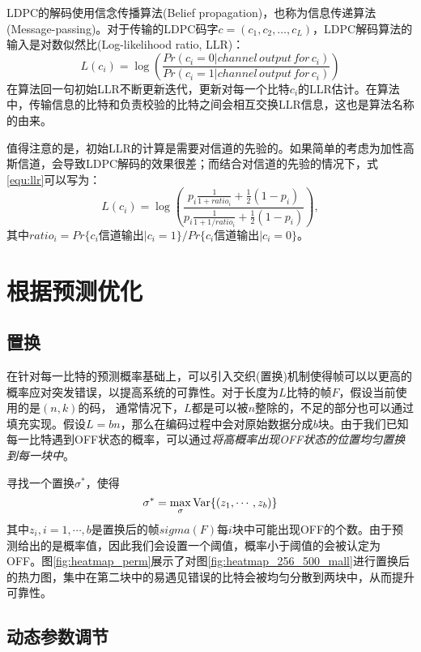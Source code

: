 LDPC的解码使用信念传播算法(Belief propagation)，也称为信息传递算法(Message-passing)。对于传输的LDPC码字$c = (c_1, c_2, …, c_{L})$，LDPC解码算法的输入是对数似然比(Log-likelihood ratio, LLR)：
\begin{equation}
\label{equ:llr}
L(c_i)=\log\left(\frac{Pr(c_i=0|channel\,output\,for\,c_i)}{Pr(c_i=1|channel\,output\,for \,c_i)}\right)
\end{equation}
在算法回一句初始LLR不断更新迭代，更新对每一个比特$c_i$的LLR估计。在算法中，传输信息的比特和负责校验的比特之间会相互交换LLR信息，这也是算法名称的由来。

值得注意的是，初始LLR的计算是需要对信道的先验的。如果简单的考虑为加性高斯信道，会导致LDPC解码的效果很差；而结合对信道的先验的情况下，式\ref{equ:llr}可以写为：
\begin{equation}
\label{equ:llr_new}
L(c_i)=\log\left(\frac{ p_i \frac{1}{1+ratio_i} + \frac{1}{2} (1-p_i) }{ p_i \frac{1}{1+1/ratio_i} + \frac{1}{2} (1-p_i)  }\right),
\end{equation}
其中$ratio_i = Pr\{c_i$信道输出$|c_i=1\}/Pr\{c_i$信道输出$|c_i=0\}$。
\section{根据预测优化}

\subsection{置换}
\label{subsec:perm}
在针对每一比特的预测概率基础上，可以引入交织(置换)机制使得帧可以以更高的概率应对突发错误，以提高系统的可靠性。对于长度为$L$比特的帧$F$，假设当前使用的是$(n,k)$的码，
通常情况下，$L$都是可以被$n$整除的，不足的部分也可以通过填充实现。假设$L = bn$，那么在编码过程中会对原始数据分成$b$块。由于我们已知每一比特遇到OFF状态的概率，可以通过\emph{将高概率出现OFF状态的位置均匀置换到每一块中}。

寻找一个置换$\sigma^\ast$，使得
\begin{equation}
\sigma^\ast = \max_\sigma \mathrm{Var} \{ (z_1, \cdots, z_b) \} 
\end{equation}
其中$z_i, i = 1,\cdots,b$是置换后的帧$sigma(F)$每$i$块中可能出现OFF的个数。由于预测给出的是概率值，因此我们会设置一个阈值，概率小于阈值的会被认定为OFF。图\ref{fig:heatmap_perm}展示了对图\ref{fig:heatmap_256_500_mall}进行置换后的热力图，集中在第二块中的易遇见错误的比特会被均匀分散到两块中，从而提升可靠性。

\subsection{动态参数调节}

